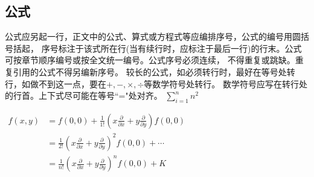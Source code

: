 \subsection{公式}
公式应另起一行，正文中的公式、算式或方程式等应编排序号，公式的编号用圆括号括起，
序号标注于该式所在行(当有续行时，应标注于最后一行)的行末。公式可按章节顺序编号或按全文统一编号。公式序号必须连续，
不得重复或跳缺。重复引用的公式不得另编新序号。
较长的公式，如必须转行时，最好在等号处转行，如做不到这一点，要在$+,
-, \times, \div$等数学符号处转行。
数学符号应写在转行处的行首。上下式尽可能在等号``="处对齐。
$\sum\limits_{i=1}^nn^2$

\begin{flushleft}
$
\begin{aligned}
  f(x,y) &= f(0,0) + \frac{1}{1!}\left(x\frac{\partial}{\partial x}+y\frac{\partial}{\partial y}\right)f(0,0) \\
         &= \frac{1}{2!}\left(x\frac{\partial}{\partial x}+y\frac{\partial}{\partial y}\right)^2f(0,0) + \cdots\\
         &= \frac{1}{n!}\left(x\frac{\partial}{\partial x}+y\frac{\partial}{\partial y}\right)^nf(0,0) + K
\end{aligned}
$
\end{flushleft}

